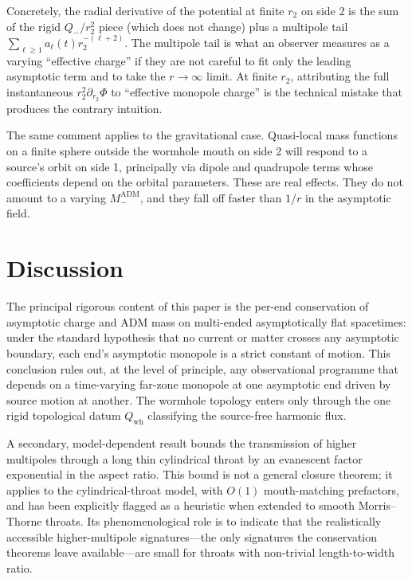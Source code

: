 \documentclass[aps,prd,onecolumn,nofootinbib,superscriptaddress]{revtex4-2}
\begin{document}
Concretely, the radial derivative of the potential at finite $r_2$ on side 2 is the sum of the rigid $Q_-/r_2^2$ piece (which does not change) plus a multipole tail $\sum_{\ell\ge 1} a_\ell(t) r_2^{-(\ell+2)}$. The multipole tail is what an observer measures as a varying ``effective charge'' if they are not careful to fit only the leading asymptotic term and to take the $r\to\infty$ limit. At finite $r_2$, attributing the full instantaneous $r_2^2 \partial_{r_2}\Phi$ to ``effective monopole charge'' is the technical mistake that produces the contrary intuition.

The same comment applies to the gravitational case. Quasi-local mass functions on a finite sphere outside the wormhole mouth on side 2 will respond to a source's orbit on side 1, principally via dipole and quadrupole terms whose coefficients depend on the orbital parameters. These are real effects. They do not amount to a varying $M_-^{\mathrm{ADM}}$, and they fall off faster than $1/r$ in the asymptotic field.

\section{Discussion}
\label{sec:discussion}

The principal rigorous content of this paper is the per-end conservation of asymptotic charge and ADM mass on multi-ended asymptotically flat spacetimes: under the standard hypothesis that no current or matter crosses any asymptotic boundary, each end's asymptotic monopole is a strict constant of motion. This conclusion rules out, at the level of principle, any observational programme that depends on a time-varying far-zone monopole at one asymptotic end driven by source motion at another. The wormhole topology enters only through the one rigid topological datum $Q_{\mathrm{wh}}$ classifying the source-free harmonic flux.

A secondary, model-dependent result bounds the transmission of higher multipoles through a long thin cylindrical throat by an evanescent factor exponential in the aspect ratio. This bound is not a general closure theorem; it applies to the cylindrical-throat model, with $O(1)$ mouth-matching prefactors, and has been explicitly flagged as a heuristic when extended to smooth Morris--Thorne throats. Its phenomenological role is to indicate that the realistically accessible higher-multipole signatures---the only signatures the conservation theorems leave available---are small for throats with non-trivial length-to-width ratio.
\end{document}
